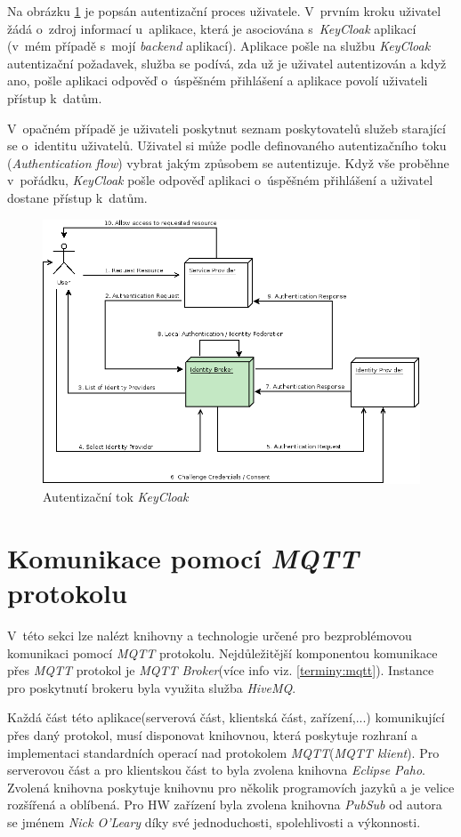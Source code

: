 Na obrázku \ref{figure:keycloak_flow} je popsán autentizační proces uživatele. V~prvním kroku uživatel žádá o~zdroj informací u~aplikace, která je asociována s~\emph{KeyCloak} aplikací (v~mém případě s~mojí \emph{backend} aplikací).
Aplikace pošle na službu \emph{KeyCloak} autentizační požadavek, služba se podívá, zda už je uživatel autentizován a když ano, pošle aplikaci odpověď o~úspěšném přihlášení a aplikace povolí uživateli přístup k~datům.

V~opačném případě je uživateli poskytnut seznam poskytovatelů služeb starající se o~identitu uživatelů.
Uživatel si může podle definovaného autentizačního toku (\emph{Authentication flow}) vybrat jakým způsobem se autentizuje. Když vše proběhne v~pořádku, \emph{KeyCloak} pošle odpověď aplikaci o~úspěšném přihlášení a uživatel dostane přístup k~datům.

\begin{figure}[hbt]
  \centering
  \includegraphics[width=.8 \linewidth]{obrazky-figures/keycloak_flow.png}
  \caption{Autentizační tok \emph{KeyCloak}}
  \label{figure:keycloak_flow}
\end{figure}

\section{Komunikace pomocí \emph{MQTT} protokolu}
\label{pouzite:mqtt}

V~této sekci lze nalézt knihovny a technologie určené pro bezproblémovou komunikaci pomocí \emph{MQTT} protokolu.
Nejdůležitější komponentou komunikace přes \emph{MQTT} protokol je \emph{MQTT Broker}(více info viz. \ref{terminy:mqtt}).
Instance pro poskytnutí brokeru byla využita služba \emph{HiveMQ}.

Každá část této aplikace(serverová část, klientská část, zařízení,...) komunikující přes daný protokol, musí disponovat knihovnou, která poskytuje rozhraní a implementaci standardních operací nad protokolem \emph{MQTT}(\emph{MQTT klient}).
Pro serverovou část a pro klientskou část to byla zvolena knihovna \emph{Eclipse Paho}.
Zvolená knihovna poskytuje knihovnu pro několik programovích jazyků a je velice rozšířená a oblíbená.
Pro HW zařízení byla zvolena knihovna \emph{PubSub} od autora se jménem \emph{Nick O'Leary} díky své jednoduchosti, spolehlivosti a výkonnosti.

